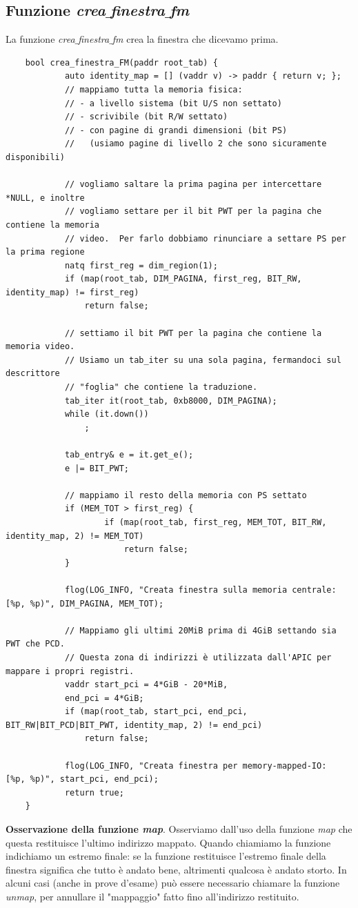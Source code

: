 \documentclass[11pt]{report}
\theoremstyle{definition}
\begin{document}
	\subsection{Funzione \emph{crea$\_$finestra$\_$fm}}
	La funzione \emph{crea$\_$finestra$\_$fm} crea la finestra che dicevamo prima. 
	\small 
	\begin{verbatim}
	bool crea_finestra_FM(paddr root_tab) {
		    auto identity_map = [] (vaddr v) -> paddr { return v; };
		    // mappiamo tutta la memoria fisica:
		    // - a livello sistema (bit U/S non settato)
		    // - scrivibile (bit R/W settato)
		    // - con pagine di grandi dimensioni (bit PS)
		    //   (usiamo pagine di livello 2 che sono sicuramente disponibili)
		
		    // vogliamo saltare la prima pagina per intercettare *NULL, e inoltre
		    // vogliamo settare per il bit PWT per la pagina che contiene la memoria
		    // video.  Per farlo dobbiamo rinunciare a settare PS per la prima regione
		    natq first_reg = dim_region(1);
		    if (map(root_tab, DIM_PAGINA, first_reg, BIT_RW, identity_map) != first_reg)
		        return false;
		
		    // settiamo il bit PWT per la pagina che contiene la memoria video.
		    // Usiamo un tab_iter su una sola pagina, fermandoci sul descrittore
		    // "foglia" che contiene la traduzione.
		    tab_iter it(root_tab, 0xb8000, DIM_PAGINA);
		    while (it.down())
		        ;
		        
		    tab_entry& e = it.get_e();
		    e |= BIT_PWT;
		
		    // mappiamo il resto della memoria con PS settato
		    if (MEM_TOT > first_reg) {
			        if (map(root_tab, first_reg, MEM_TOT, BIT_RW, identity_map, 2) != MEM_TOT)
			            return false;
		    }
		
		    flog(LOG_INFO, "Creata finestra sulla memoria centrale:  [%p, %p)", DIM_PAGINA, MEM_TOT);
		
		    // Mappiamo gli ultimi 20MiB prima di 4GiB settando sia PWT che PCD.
		    // Questa zona di indirizzi è utilizzata dall'APIC per mappare i propri registri.
		    vaddr start_pci = 4*GiB - 20*MiB,
		    end_pci = 4*GiB;
		    if (map(root_tab, start_pci, end_pci, BIT_RW|BIT_PCD|BIT_PWT, identity_map, 2) != end_pci)
		        return false;
		
		    flog(LOG_INFO, "Creata finestra per memory-mapped-IO:    [%p, %p)", start_pci, end_pci);
		    return true;
	}
	\end{verbatim}
	\normalsize 
\begin{framed}
\noindent \textbf{Osservazione della funzione \emph{map}}. Osserviamo dall'uso della funzione \emph{map} che questa restituisce l'ultimo indirizzo mappato. Quando chiamiamo la funzione indichiamo un estremo finale: se la funzione restituisce l'estremo finale della finestra significa che tutto è andato bene, altrimenti qualcosa è andato storto. In alcuni casi (anche in prove d'esame) può essere necessario chiamare la funzione \emph{unmap}, per annullare il "mappaggio" fatto fino all'indirizzo restituito.
\end{framed} 
\end{document}
